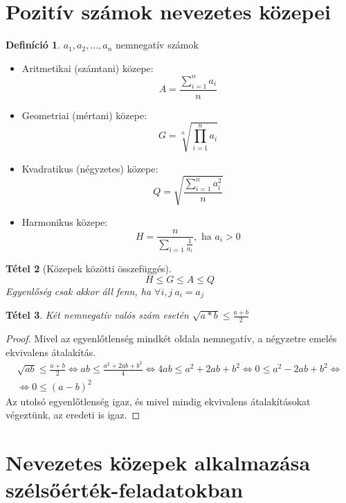\documentclass[twoside,12pt]{report}
\newtheorem{theorem}{Tétel}[section]
\theoremstyle{definition}
\newtheorem{definition}[theorem]{Definíció}
\begin{document}
\section{Pozitív számok nevezetes közepei}
	\begin{definition}
		$a_1,a_2,\dots,a_n$ nemnegatív számok
		\begin{itemize}
			\item Aritmetikai (számtani) közepe: 
			\begin{equation*}
				A=\frac{\sum_{i=1}^n a_i}{n}
			\end{equation*}
			\item Geometriai (mértani) közepe:
			\begin{equation*}
				G=\sqrt[n]{\prod_{i=1}^n a_i}
			\end{equation*}
			\item Kvadratikus (négyzetes) közepe:
			\begin{equation*}
				Q=\sqrt{\frac{\sum_{i=1}^na_i^2}{n}}
			\end{equation*}
			\item Harmonikus közepe:
			\begin{equation*}
				H=\frac{n}{\sum_{i=1}\frac{1}{a_i}},\text{ ha } a_i>0
			\end{equation*}
		\end{itemize}
	\end{definition}
	\begin{theorem}[Közepek közötti összefüggés]
		\begin{equation*}
		H\le G\le A\le Q
		\end{equation*}
		Egyenlőség csak akkor áll fenn, ha $\forall i,j\ a_i=a_j$
	\end{theorem}
	\begin{theorem}
		Két nemnegatív valós szám esetén $\sqrt{a*b}\le \frac{a+b}{2}$
	\end{theorem}
	\begin{proof}
		Mivel az egyenlőtlenség mindkét oldala nemnegatív, a négyzetre emelés ekvivalens átalakítás.
		\begin{gather*}
			\sqrt{ab}\le\frac{a+b}{2}\Leftrightarrow ab\le\frac{a^2+2ab+b^2}{4}\Leftrightarrow 
			4ab\le a^2+2ab+b^2\Leftrightarrow 0\le a^2-2ab+b^2\Leftrightarrow\\
			\Leftrightarrow 0\le (a-b)^2
		\end{gather*}
		Az utolsó egyenlőtlenség igaz, és mivel mindig ekvivalens átalakításokat végeztünk, az eredeti is igaz.
	\end{proof}
\section{Nevezetes közepek alkalmazása szélsőérték-feladatokban}
\end{document}
